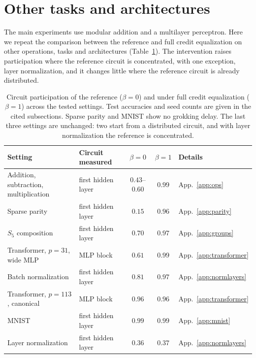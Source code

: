 \documentclass{article} %
\begin{document}
\section{Other tasks and architectures}
\label{app:scope}
The main experiments use modular addition and a multilayer perceptron. Here we repeat the comparison between the reference and full credit equalization on other operations, tasks and architectures (Table~\ref{tab:scope}). The intervention raises participation where the reference circuit is concentrated, with one exception, layer normalization, and it changes little where the reference circuit is already distributed.

\begin{table}[!ht]
\caption{Circuit participation of the reference ($\beta{=}0$) and under full credit equalization ($\beta{=}1$) across the tested settings. Test accuracies and seed counts are given in the cited subsections. Sparse parity and MNIST show no grokking delay. The last three settings are unchanged: two start from a distributed circuit, and with layer normalization the reference is concentrated.}
\label{tab:scope}
\begin{center}
\footnotesize
\setlength{\tabcolsep}{5pt}
\begin{tabular}{llccl}
\toprule
Setting & Circuit measured & $\beta{=}0$ & $\beta{=}1$ & Details \\
\midrule
Addition, subtraction, multiplication & first hidden layer & $0.43$--$0.60$ & $0.99$ & App.~\ref{app:ops} \\
Sparse parity           & first hidden layer & $0.15$ & $0.96$ & App.~\ref{app:parity} \\
$S_5$ composition       & first hidden layer & $0.70$ & $0.97$ & App.~\ref{app:groups} \\
Transformer, $p=31$, wide MLP & MLP block & $0.61$ & $0.99$ & App.~\ref{app:transformer} \\
Batch normalization & first hidden layer & $0.81$ & $0.97$ & App.~\ref{app:normlayers} \\
\midrule
Transformer, $p=113$, canonical & MLP block & $0.96$ & $0.96$ & App.~\ref{app:transformer} \\
MNIST                   & first hidden layer & $0.99$ & $0.99$ & App.~\ref{app:mnist} \\
Layer normalization & first hidden layer & $0.36$ & $0.37$ & App.~\ref{app:normlayers} \\
\bottomrule
\end{tabular}
\end{center}
\end{table}
\end{document}
